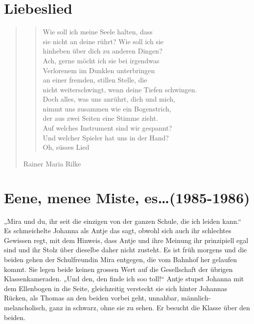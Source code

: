 \documentclass[10pt,titlepage,a5paper]{book}
\newenvironment{tg}{\begin{quote}\em}{\end{quote}}
\newenvironment{dichter}{\begin{flushright}}{\end{flushright}}
\begin{document}
\section*{Liebeslied}


\begin{tg}
\begin{verse}
Wie soll ich meine Seele halten, dass\\
sie nicht an deine rührt? Wie soll ich sie\\
hinheben über dich zu anderen Dingen?\\
Ach, gerne möcht ich sie bei irgendwas\\
Verlorenem im Dunklen unterbringen\\
an einer fremden, stillen Stelle, die\\
nicht weiterschwingt, wenn deine Tiefen sch\-wingen.\\
Doch alles, was uns anrührt, dich und mich,\\
nimmt uns zusammen wie ein Bogenstrich,\\
der aus zwei Seiten eine Stimme zieht.\\
Auf welches Instrument sind wir gespannt?\\
Und welcher Spieler hat uns in der Hand?\\
Oh, süsses Lied
\end{verse}
\begin{dichter}Rainer Maria Rilke\end{dichter}
\end{tg}

\section*{Eene, menee Miste, es\dots (1985-1986)}




„Mira und du, ihr seit die einzigen von der ganzen Schule, die ich leiden kann.“ Es schmeichelte Johanna als Antje das sagt, obwohl sich auch ihr schlechtes Gewissen regt, mit dem Hinweis, dass Antje und ihre Meinung ihr prinzipiell egal sind und ihr Stolz über dieselbe daher  nicht zusteht. Es ist früh morgens und die beiden gehen der Schulfreundin Mira entgegen, die vom Bahnhof her gelaufen kommt. Sie legen beide keinen grossen Wert auf die Gesellschaft der übrigen Klassenkameraden. „Und den, den finde ich soo toll!“ Antje stupst Johanna mit dem Ellenbogen in die Seite, gleichzeitig versteckt sie sich hinter Johannas Rücken, als Thomas an den beiden vorbei geht, unnahbar, männlich-melancholisch, ganz in schwarz, ohne sie zu sehen. Er besucht die Klasse über den beiden. 
\end{document}
